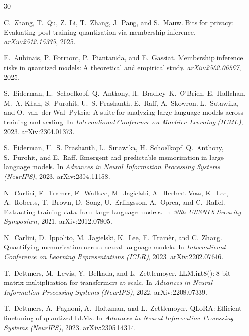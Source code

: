\documentclass{article}
\begin{document}

\begin{thebibliography}{30}
\small

C.~Zhang, T.~Qu, Z.~Li, T.~Zhang, J.~Pang, and S.~Mauw.
\newblock Bits for privacy: Evaluating post-training quantization via
  membership inference.
\newblock \emph{arXiv:2512.15335}, 2025.

E.~Aubinais, P.~Formont, P.~Piantanida, and E.~Gassiat.
\newblock Membership inference risks in quantized models: A theoretical and
  empirical study.
\newblock \emph{arXiv:2502.06567}, 2025.

S.~Biderman, H.~Schoelkopf, Q.~Anthony, H.~Bradley, K.~O'Brien, E.~Hallahan,
  M.~A. Khan, S.~Purohit, U.~S. Prashanth, E.~Raff, A.~Skowron, L.~Sutawika,
  and O.~van~der Wal.
\newblock Pythia: A suite for analyzing large language models across training
  and scaling.
\newblock In \emph{International Conference on Machine Learning (ICML)}, 2023.
  arXiv:2304.01373.

S.~Biderman, U.~S. Prashanth, L.~Sutawika, H.~Schoelkopf, Q.~Anthony,
  S.~Purohit, and E.~Raff.
\newblock Emergent and predictable memorization in large language models.
\newblock In \emph{Advances in Neural Information Processing Systems
  (NeurIPS)}, 2023. arXiv:2304.11158.

N.~Carlini, F.~Tram\`er, E.~Wallace, M.~Jagielski, A.~Herbert-Voss, K.~Lee,
  A.~Roberts, T.~Brown, D.~Song, U.~Erlingsson, A.~Oprea, and C.~Raffel.
\newblock Extracting training data from large language models.
\newblock In \emph{30th USENIX Security Symposium}, 2021. arXiv:2012.07805.

N.~Carlini, D.~Ippolito, M.~Jagielski, K.~Lee, F.~Tram\`er, and C.~Zhang.
\newblock Quantifying memorization across neural language models.
\newblock In \emph{International Conference on Learning Representations
  (ICLR)}, 2023. arXiv:2202.07646.

T.~Dettmers, M.~Lewis, Y.~Belkada, and L.~Zettlemoyer.
\newblock LLM.int8(): 8-bit matrix multiplication for transformers at scale.
\newblock In \emph{Advances in Neural Information Processing Systems
  (NeurIPS)}, 2022. arXiv:2208.07339.

T.~Dettmers, A.~Pagnoni, A.~Holtzman, and L.~Zettlemoyer.
\newblock QLoRA: Efficient finetuning of quantized LLMs.
\newblock In \emph{Advances in Neural Information Processing Systems
  (NeurIPS)}, 2023. arXiv:2305.14314.


\end{thebibliography}
\end{document}
